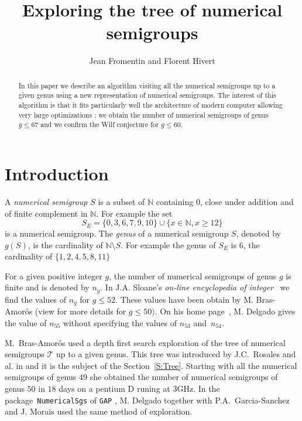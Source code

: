 \documentclass[reqno,11pt]{amsart}
\title{Exploring the tree of numerical semigroups}
\author{Jean Fromentin and  Florent Hivert}
\theoremstyle{plain}
\theoremstyle{definition}
\renewcommand{\leq}{\leqslant}
\renewcommand{\geq}{\geqslant}
\newcommand{\NN}{\mathbb{N}}
\renewcommand{\tt}[1]{\texttt{#1}}
\begin{document}
\begin{abstract}
  In this paper we describe an algorithm visiting all the numerical semigroups
  up to a given genus using a new representation of numerical semigroups. The
  interest of this algorithm is that it fits particularly well the
  architecture of modern computer allowing very large optimizations : we obtain the number of numerical semigroups of genus $g\leq  67$ and we confirm the Wilf conjecture for $g\leq 60$.
  
\end{abstract}

\maketitle

\section*{Introduction}

A \emph{numerical semigroup} $S$ is a subset of $\NN$ containing $0$, close under addition and of finite complement in $\NN$.  
For example the set 
\begin{equation}
\label{E:NSG}
S_E=\{0,3,6,7,9,10\}\cup\{x\in\NN, x\geq 12\}
\end{equation}
is a numerical semigroup.
The \emph{genus} of a numerical semigroup $S$, denoted by~$g(S)$, is the cardinality of $\NN\setminus S$.
 For example the genus of $S_E$ is $6$,  the cardinality of $\{1,2,4,5,8,11\}$

For a given positive integer $g$, the number of numerical semigroups of genus $g$ is finite and is denoted by $n_g$. 
In  J.A. Sloane's \emph{on-line encyclopedia of integer}~\cite{OEIS} we find the values of $n_g$ for $g\leq 52$. 
These values have been obtain by M. Bras-Amor\'os (view \cite{BrasAmoros2008} for more details for $g\leq 50)$. 
On his home page~\cite{Delgado}, M. Delgado  gives the value of $n_{55}$ without specifying the values of $n_{53}$ and~$n_{54}$. 

M.~Bras-Amor\'os used a depth first search exploration of the tree of numerical semigroups $\mathcal{T}$ up to a given genus.
This tree was introduced by J.C.~Rosales and al. in \cite{Rosales} and it is the subject of the Section~\ref{S:Tree}.
Starting with all the numerical semigroups of genus $49$ she obtained the number of numerical semigroups of genus $50$ in $18$ days on a pentium D runing at $3$GHz. 
In the package~\tt{NumericalSgs} \cite{NumericalSgps} of \tt{GAP} \cite{GAP}, M. Delgado together with P.A.~Garcia-Sanchez and J. Morais used the same method of exploration.
\end{document}
